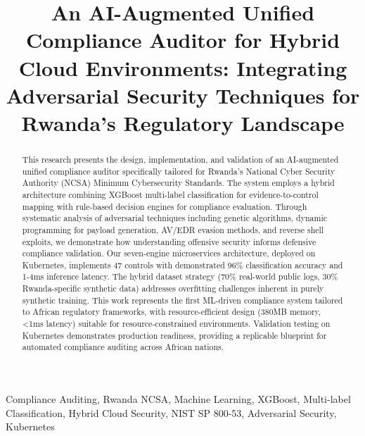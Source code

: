 \documentclass[11pt,conference]{IEEEtran}
\begin{document}
\title{An AI-Augmented Unified Compliance Auditor for Hybrid Cloud Environments: Integrating Adversarial Security Techniques for Rwanda's Regulatory Landscape}

\author{
}

\maketitle

\begin{abstract}
This research presents the design, implementation, and validation of an AI-augmented unified compliance auditor specifically tailored for Rwanda's National Cyber Security Authority (NCSA) Minimum Cybersecurity Standards. The system employs a hybrid architecture combining XGBoost multi-label classification for evidence-to-control mapping with rule-based decision engines for compliance evaluation. Through systematic analysis of adversarial techniques including genetic algorithms, dynamic programming for payload generation, AV/EDR evasion methods, and reverse shell exploits, we demonstrate how understanding offensive security informs defensive compliance validation. Our seven-engine microservices architecture, deployed on Kubernetes, implements 47 controls with demonstrated 96\% classification accuracy and 1-4ms inference latency. The hybrid dataset strategy (70\% real-world public logs, 30\% Rwanda-specific synthetic data) addresses overfitting challenges inherent in purely synthetic training. This work represents the first ML-driven compliance system tailored to African regulatory frameworks, with resource-efficient design (380MB memory, <1ms latency) suitable for resource-constrained environments. Validation testing on Kubernetes demonstrates production readiness, providing a replicable blueprint for automated compliance auditing across African nations.
\end{abstract}

\begin{IEEEkeywords}
Compliance Auditing, Rwanda NCSA, Machine Learning, XGBoost, Multi-label Classification, Hybrid Cloud Security, NIST SP 800-53, Adversarial Security, Kubernetes
\end{IEEEkeywords}
\end{document}
